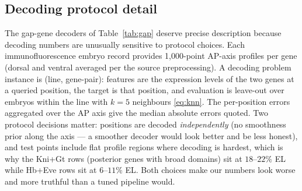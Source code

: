 \subsection{Decoding protocol detail}

The gap-gene decoders of Table~\ref{tab:gap} deserve precise description
because decoding numbers are unusually sensitive to protocol choices. Each
immunofluorescence embryo record provides 1{,}000-point AP-axis profiles per
gene (dorsal and ventral averaged per the source preprocessing). A decoding
problem instance is (line, gene-pair): features are the expression levels of
the two genes at a queried position, the target is that position, and
evaluation is leave-out over embryos within the line with $k = 5$ neighbours
\eqref{eq:knn}. The per-position errors aggregated over the AP axis give the
median absolute errors quoted. Two protocol decisions matter: positions are
decoded \emph{independently} (no smoothness prior along the axis --- a
smoother decoder would look better and be less honest), and test points
include flat profile regions where decoding is hardest, which is why the
Kni+Gt rows (posterior genes with broad domains) sit at $18$--$22\%$ EL while
Hb+Eve rows sit at $6$--$11\%$ EL. Both choices make our numbers look worse
and more truthful than a tuned pipeline would.
